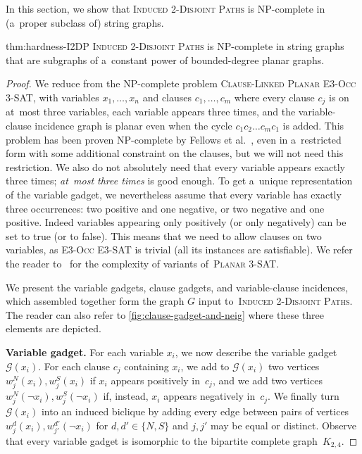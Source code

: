 \documentclass[a4paper,UKenglish,cleveref,autoref]{lipics-v2021}
\begin{document}
In this section, we show that \textsc{Induced 2-Disjoint Paths} is NP-complete in (a~proper subclass of) string graphs.

\begin{reptheorem}{thm:hardness-I2DP}
  \textsc{Induced 2-Disjoint Paths} is NP-complete in string graphs that are subgraphs of a~constant power of bounded-degree planar graphs.
\end{reptheorem}

\begin{proof}
  We reduce from the NP-complete problem \textsc{Clause-Linked Planar E3-Occ 3-SAT}, with variables $x_1, \ldots, x_n$ and clauses $c_1, \ldots, c_m$ where every clause $c_j$ is on at~most three variables, each variable appears three times, and the variable-clause incidence graph is planar even when the cycle $c_1c_2 \ldots c_mc_1$ is added.
  This problem has been proven NP-complete by Fellows et al.~\cite{Fellows95}, even in a~restricted form with some additional constraint on the clauses, but we will not need this restriction.
  We also do not absolutely need that every variable appears exactly three times; \emph{at~most three times} is good enough.
  To get a~unique representation of the variable gadget, we nevertheless assume that every variable has exactly three occurrences: two positive and one negative, or two negative and one positive.
  Indeed variables appearing only positively (or only negatively) can be set to true (or to false).
  This means that we need to allow clauses on two variables, as \textsc{E3-Occ E3-SAT} is trivial (all its instances are satisfiable).
  We refer the reader to~\cite{Tippenhauer16} for the complexity of variants of~\textsc{Planar 3-SAT}.
  
  We present the variable gadgets, clause gadgets, and variable-clause incidences, which assembled together form the graph $G$ input to~\textsc{Induced 2-Disjoint Paths}.
  The reader can also refer to \cref{fig:clause-gadget-and-neig} where these three elements are depicted.

  \medskip

  \textbf{Variable gadget.}
  For each variable $x_i$, we now describe the variable gadget $\mathcal G(x_i)$.
  For each clause $c_j$ containing $x_i$, we add to $\mathcal G(x_i)$ two vertices $w_j^N(x_i), w_j^S(x_i)$ if $x_i$ appears positively in~$c_j$, and we add two vertices $w_j^N(\neg x_i), w_j^S(\neg x_i)$ if, instead, $x_i$ appears negatively in~$c_j$.
  We finally turn $\mathcal G(x_i)$ into an induced biclique by adding every edge between pairs of vertices $w_j^d(x_i), w_{j'}^{d'}(\neg x_i)$ for $d, d' \in \{N,S\}$ and $j, j'$ may be equal or distinct.
  Observe that every variable gadget is isomorphic to the bipartite complete graph~$K_{2,4}$.


\end{proof}
\end{document}
